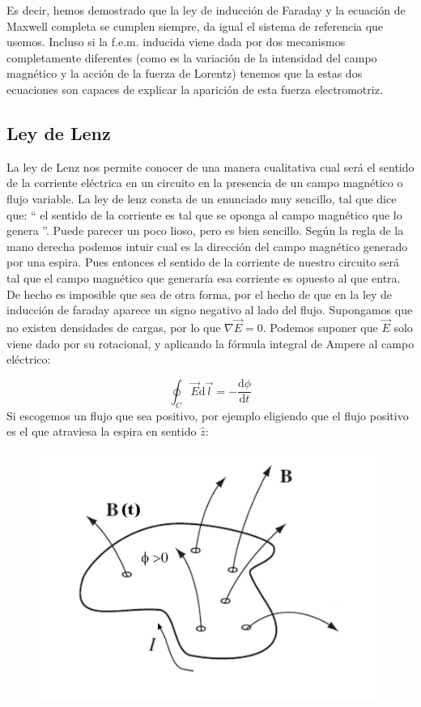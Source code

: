 \documentclass[12pt]{article}
\newcommand{\D}{\mathrm{d}}
\begin{document}
Es decir, hemos demostrado que la ley de inducción de Faraday y la ecuación de Maxwell completa se cumplen siempre, da igual el sistema de referencia que usemos. Incluso si la f.e.m. inducida viene dada por dos mecanismos completamente diferentes (como es la variación de la intensidad del campo magnético y la acción de la fuerza de Lorentz) tenemos que la estas dos ecuaciones son capaces de explicar la aparición de esta fuerza electromotriz. \\

\subsection{Ley de Lenz}

La ley de Lenz nos permite conocer de una manera cualitativa cual será el sentido de la corriente eléctrica en un circuito en la presencia de un campo magnético o flujo variable. La ley de lenz consta de un enunciado muy sencillo, tal que dice que: `` el sentido de la corriente es tal que se oponga al campo magnético que lo genera ''. Puede parecer un poco lioso, pero es bien sencillo. Según la regla de la mano derecha podemos intuir cual es la dirección del campo magnético generado por una espira. Pues entonces el sentido de la corriente de nuestro circuito será tal que el campo magnético que generaría esa corriente es opuesto al que entra. \\

De hecho es imposible que sea de otra forma, por el hecho de que en la ley de inducción de faraday aparece un signo negativo al lado del flujo. Supongamos que no existen densidades de cargas, por lo que $\nabla \vec{E} = 0$. Podemos suponer que $\vec{E}$ solo viene dado por su rotacional, y aplicando la fórmula integral de Ampere al campo eléctrico:

\begin{equation}
\oint_C \vec{E} \D \vec{l} = - \dfrac{\D \phi}{\D t}
\end{equation}
Si escogemos un flujo que sea positivo, por ejemplo eligiendo que el flujo positivo es el que atraviesa la espira en sentido $\widehat{z}$:

\begin{figure}[h!] \centering
\includegraphics[scale=0.9]{espiras-lenz.png}
\end{figure}
\end{document}
